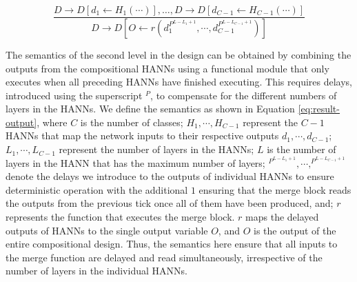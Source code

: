 \begin{equation}
    \frac{D \rightarrow D[d_{1} \leftarrow H_1(\cdots)], \dots, D \rightarrow D[d_{C-1} \leftarrow H_{C-1}(\cdots)]}
    { D \rightarrow D[O \leftarrow r(d_{1}^{P^{L-L_1+1}}, \cdots, d_{C-1}^{P^{L-L_{C-1}+1}})]}
    \label{eq:result-output}
\end{equation}



The semantics of the second level in the design can be obtained by combining the outputs from the compositional HANNs using a functional module that only executes when all preceding HANNs have finished executing. This requires delays, introduced using the superscript $^P$, to compensate for the different numbers of layers in the HANNs. We define the semantics as shown in Equation \ref{eq:result-output}, where $C$ is the number of classes; $H_{1}, \cdots, H_{C-1}$ represent the $C-1$ HANNs that map the network inputs to their respective outputs $d_{1}, \cdots, d_{C-1}$; $L_1, \cdots, L_{C-1}$ represent the number of layers in the HANNs; $L$ is the number of layers in the HANN that has the maximum number of layers; $^{P^{L-L_1 + 1}}, \cdots, ^{P^{L - L_{C-1}+1}}$ denote the delays we introduce to the outputs of individual HANNs to ensure deterministic operation with the additional $1$ ensuring that the merge block reads the outputs from the previous tick once all of them have been produced, and; $r$ represents the function that executes the merge block. $r$ maps the delayed outputs of HANNs to the single output variable $O$, and $O$ is the output of the entire compositional design. Thus, the semantics here ensure that all inputs to the merge function are delayed and read simultaneously, irrespective of the number of layers in the individual HANNs.




